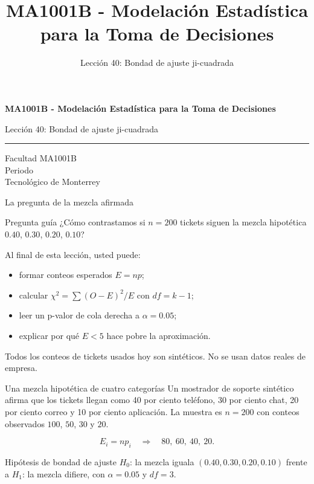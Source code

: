 \documentclass[aspectratio=169,10pt,spanish]{beamer}
\title{MA1001B - Modelación Estadística para la Toma de Decisiones}
\subtitle{Lección 40: Bondad de ajuste ji-cuadrada}
\author{}
\institute{Tecnol\'ogico de Monterrey}
\date{}
\begin{document}
\begin{frame}[plain]
  \vspace{1.2cm}
  {\Large\bfseries MA1001B - Modelación Estadística para la Toma de Decisiones\par}
  \vspace{0.7cm}
  {\large Lección 40: Bondad de ajuste ji-cuadrada\par}
  \vspace{0.7cm}
  {\color{TecRojo}\rule{\textwidth}{1.2pt}}
  \vspace{0.8cm}

  Facultad MA1001B\\[0.3cm]
  Periodo\\[0.3cm]
  Tecnol\'ogico de Monterrey
\end{frame}

\begin{frame}{La pregunta de la mezcla afirmada}
  \begin{alertblock}{Pregunta guía}
    ¿Cómo contrastamos si $n=200$ tickets siguen la mezcla hipotética
    $0.40$, $0.30$, $0.20$, $0.10$?
  \end{alertblock}

  \vspace{0.6em}
  Al final de esta lección, usted puede:
  \begin{itemize}
    \item formar conteos esperados $E=np$;
    \item calcular $\chi^2=\sum(O-E)^2/E$ con $df=k-1$;
    \item leer un p-valor de cola derecha a $\alpha=0.05$;
    \item explicar por qué $E<5$ hace pobre la aproximación.
  \end{itemize}

  \vfill
  \scriptsize Todos los conteos de tickets usados hoy son sintéticos. No se usan datos reales de empresa.
\end{frame}

\begin{frame}{Una mezcla hipotética de cuatro categorías}
  \small
  Un mostrador de soporte sintético afirma que los tickets llegan como 40
  por ciento teléfono, 30 por ciento chat, 20 por ciento correo y 10 por
  ciento aplicación. La muestra es $n=200$ con conteos observados $100$,
  $50$, $30$ y $20$.

  \[
    E_i = np_i \quad\Rightarrow\quad 80,\ 60,\ 40,\ 20.
  \]

  \begin{exampleblock}{Hipótesis de bondad de ajuste}
    $H_0$: la mezcla iguala $(0.40,0.30,0.20,0.10)$ frente a $H_1$: la
    mezcla difiere, con $\alpha=0.05$ y $df=3$.
  \end{exampleblock}
\end{frame}
\end{document}

